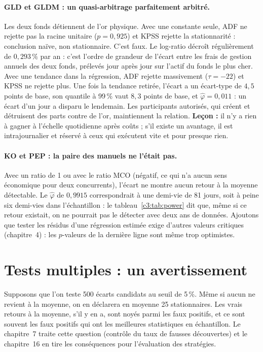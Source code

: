 \paragraph{GLD et GLDM : un quasi-arbitrage parfaitement arbitré.} Les deux fonds détiennent de l'or physique. Avec une constante seule, ADF ne rejette pas la racine unitaire ($p = 0{,}925$) et KPSS rejette la stationnarité : conclusion naïve, \og non stationnaire\fg. C'est faux. Le log-ratio décroît régulièrement de $0{,}293\,\%$ par an : c'est l'ordre de grandeur de l'écart entre les frais de gestion annuels des deux fonds, prélevés jour après jour sur l'actif du fonds le plus cher. Avec une tendance dans la régression, ADF rejette massivement ($\tau = -22$) et KPSS ne rejette plus. Une fois la tendance retirée, l'écart a un écart-type de $4{,}5$ points de base, son quantile à 99\,\% vaut $8{,}3$ points de base, et $\hat\varphi = 0{,}011$ : un écart d'un jour a disparu le lendemain. Les participants autorisés, qui créent et détruisent des parts contre de l'or, maintiennent la relation. \textbf{Leçon :} il n'y a rien à gagner à l'échelle quotidienne après coûts ; s'il existe un avantage, il est intrajournalier et réservé à ceux qui exécutent vite et pour presque rien.

\paragraph{KO et PEP : la paire des manuels ne l'était pas.} Avec un ratio de 1 ou avec le ratio MCO (négatif, ce qui n'a aucun sens économique pour deux concurrents), l'écart ne montre aucun retour à la moyenne détectable. Le $\hat\varphi$ de $0{,}9915$ correspondrait à une demi-vie de 81 jours, soit à peine six demi-vies dans l'échantillon : le tableau~\ref{c3:tab:power} dit que, même si ce retour existait, on ne pourrait pas le détecter avec deux ans de données. Ajoutons que tester les résidus d'une régression estimée exige d'autres valeurs critiques (chapitre~4) : les $p$-valeurs de la dernière ligne sont même trop optimistes.

\section{Tests multiples : un avertissement}

Supposons que l'on teste 500 écarts candidats au seuil de 5\,\%. Même si aucun ne revient à la moyenne, on en déclarera en moyenne 25 \og stationnaires\fg. Les vrais retours à la moyenne, s'il y en a, sont noyés parmi les faux positifs, et ce sont souvent les faux positifs qui ont les meilleures statistiques en échantillon. Le chapitre~7 traite cette question (contrôle du taux de fausses découvertes) et le chapitre~16 en tire les conséquences pour l'évaluation des stratégies.

